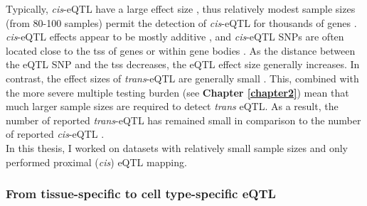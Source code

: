 Typically, \textit{cis}-eQTL have a large effect size \cite{sherman2009systematic}, thus relatively modest sample sizes (from 80-100 samples) permit the detection of \textit{cis}-eQTL for thousands of genes \cite{stranger2007population, myers2007survey}
. 
\textit{cis}-eQTL effects appear to be mostly additive \cite{powell2013congruence}, and \textit{cis}-eQTL SNPs are often located close to the \gls{tss} of genes or within gene bodies 
\cite{vosa2018unraveling}. 
As the distance between the eQTL SNP and the \gls{tss} decreases, the eQTL effect size generally increases.
In contrast, the effect sizes of \textit{trans}-eQTL are generally small \cite{cookson2009mapping, grundberg2012mapping}. 
This, combined with the more severe multiple testing burden (see \textbf{Chapter 
\ref{chapter2}})
mean that much larger sample sizes are required to detect \textit{trans} eQTL.
As a result, the number of reported \textit{trans}-eQTL has remained small
\cite{grundberg2012mapping}
in comparison to the number of reported \textit{cis}-eQTL \cite{westra2014genome}.\\

In this thesis, I worked on datasets with relatively small sample sizes and only performed proximal (\textit{cis}) eQTL mapping.

\subsubsection{From tissue-specific to cell type-specific eQTL}
\label{sec:eqtl_celltype_specific}


